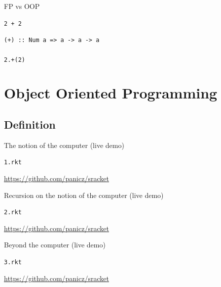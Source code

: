 \documentclass{beamer}
\begin{document}
\begin{frame}{FP vs OOP}
  \begin{center}
    \Huge
    \texttt{2 + 2} \\ \pause
  \end{center}
  \large
  \texttt{(+) :: Num a => a -> a -> a\\
    \ } \\ \pause
  \texttt{2.+(2)}
\end{frame}

\section{Object Oriented Programming}

\subsection{Definition}

%

\begin{frame}{The notion of the computer (live demo)}
  \begin{center}
    \Huge
    \texttt{1.rkt}
  \end{center}
  \url{https://github.com/panicz/sracket}
\end{frame}

%

\begin{frame}{Recursion on the notion of the computer (live demo)}
  \begin{center}
    \Huge
    \texttt{2.rkt}
  \end{center}
  \url{https://github.com/panicz/sracket}
\end{frame}

% 

\begin{frame}{Beyond the computer (live demo)}
  \begin{center}
    \Huge
    \texttt{3.rkt}
  \end{center}
  \url{https://github.com/panicz/sracket}
\end{frame}

%
\end{document}
